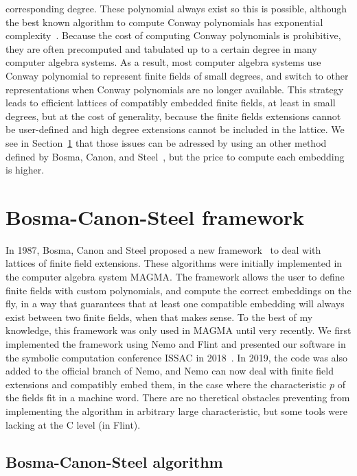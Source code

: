 corresponding degree. These polynomial always exist so this is possible,
although the best known algorithm to compute Conway polynomials has exponential
complexity~\cite{HL98}. Because the cost of computing Conway polynomials is
prohibitive, they are often precomputed and tabulated up to a certain degree in
many computer algebra systems. As a result, most computer algebra systems use
Conway polynomial to represent finite fields of small degrees, and switch to
other representations when Conway polynomials are no longer available. This
strategy leads to efficient lattices of compatibly embedded finite fields, at
least in small degrees, but at the cost of generality, because the finite fields
extensions cannot be user-defined and high degree extensions cannot be included
in the lattice. We see in Section~\ref{sec:bosma-canon-steel} that those issues
can be adressed by using an other method 
defined by Bosma, Canon, and Steel~\cite{BCS97}, but the price to compute each
embedding is higher.

\section{Bosma-Canon-Steel framework}
\label{sec:bosma-canon-steel}

In 1987, Bosma, Canon and Steel proposed a new framework~\cite{BCS97} to deal
with lattices of finite field extensions. These algorithms were initially
implemented in the computer algebra system MAGMA. The framework allows the user
to define finite fields with custom polynomials, and compute the
correct embeddings on the fly, in a way that guarantees that at least one
compatible embedding will always exist between two finite fields, when that
makes sense. To the best of my knowledge, this framework was only used in MAGMA
until very recently. We first implemented the framework using Nemo and Flint and
presented our software in the symbolic computation conference ISSAC in
2018~\cite{DRR18}. In 2019, the code was also added to the official branch of
Nemo, and Nemo can now deal with finite field extensions and compatibly embed
them, in the case where the characteristic $p$ of the fields fit in a machine
word. There are no theretical obstacles preventing from implementing the algorithm in arbitrary
large characteristic, but some tools were lacking at the C level (\ie in
Flint).

\subsection{Bosma-Canon-Steel algorithm}

